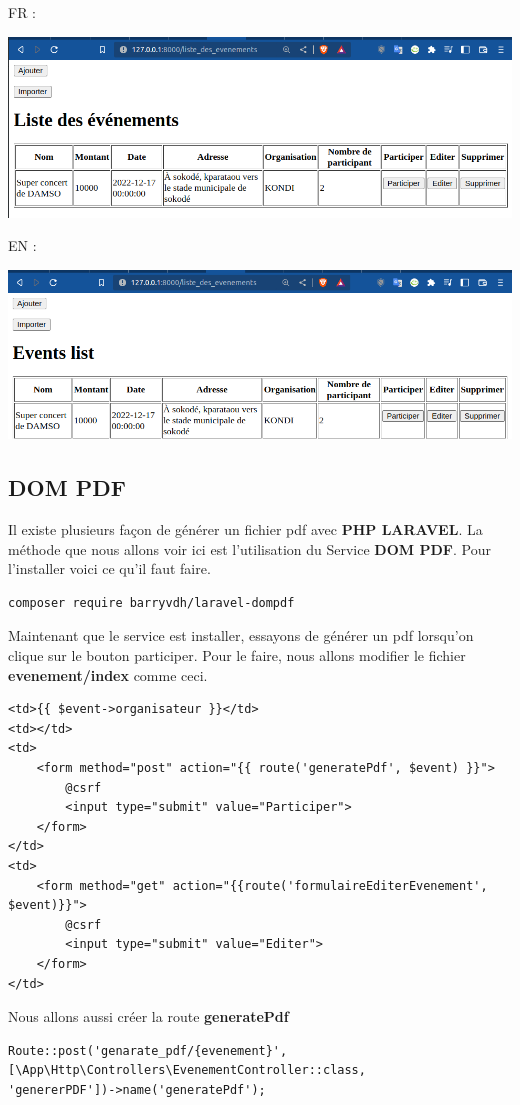 \documentclass[12pt,a4paper]{article}
\begin{document}
FR :
\begin{center}
\includegraphics[scale=0.5]{img/fr.png}
\end{center}
EN :
\begin{center}
\includegraphics[scale=0.5]{img/en.png}
\end{center}

\subsection{DOM PDF}
Il existe plusieurs façon de générer un fichier pdf avec \textbf{PHP LARAVEL}. La méthode que 
nous allons voir ici est l'utilisation du Service \textbf{DOM PDF}.
Pour l'installer voici ce qu'il faut faire.

\begin{verbatim}
composer require barryvdh/laravel-dompdf
\end{verbatim}

Maintenant que le service est installer, essayons de générer un pdf lorsqu'on clique sur le bouton
participer. Pour le faire, nous allons modifier le fichier \textbf{evenement/index} comme ceci.
\begin{verbatim}
<td>{{ $event->organisateur }}</td>
<td></td>
<td>
	<form method="post" action="{{ route('generatePdf', $event) }}">
		@csrf
		<input type="submit" value="Participer">
	</form>
</td>
<td>
	<form method="get" action="{{route('formulaireEditerEvenement', $event)}}">
		@csrf
		<input type="submit" value="Editer">
	</form>
</td>
\end{verbatim}

Nous allons aussi créer la route \textbf{generatePdf} 
\begin{verbatim}
Route::post('genarate_pdf/{evenement}', [\App\Http\Controllers\EvenementController::class,
'genererPDF'])->name('generatePdf');
\end{verbatim}
\end{document}
